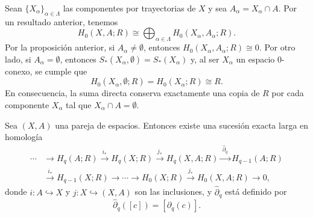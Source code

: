 \begin{dem}
Sean $\{X_\alpha\}_{\alpha \in \Lambda}$ las componentes por trayectorias de $X$ y sea $A_\alpha = X_\alpha \cap A$. Por un resultado anterior, tenemos
\[
H_0(X, A; R) \cong \bigoplus_{\alpha \in \Lambda} H_0(X_\alpha, A_\alpha; R).
\]
Por la proposición anterior, si $A_\alpha \neq \emptyset$, entonces $H_0(X_\alpha, A_\alpha; R) \cong 0$. Por otro lado, si $A_\alpha = \emptyset$, entonces $S_*(X_\alpha, \emptyset) = S_*(X_\alpha)$ y, al ser $X_\alpha$ un espacio $0$-conexo, se cumple que 
$$H_0(X_\alpha, \emptyset; R) = H_0(X_\alpha; R) \cong R.$$ 
En consecuencia, la suma directa conserva exactamente una copia de $R$ por cada componente $X_\alpha$ tal que $X_\alpha \cap A = \emptyset$.
\end{dem}
\begin{teorema}
Sea $(X, A)$ una pareja de espacios. Entonces existe una sucesión exacta larga en homología
\begin{align*}
\cdots &\longrightarrow H_q(A; R) \xrightarrow{\;i_*\;} H_q(X; R) \xrightarrow{\;j_*\;} H_q(X, A; R) \xrightarrow{\;\hat{\partial}_q\;} H_{q-1}(A; R) \\
&\xrightarrow{\;i_*\;} H_{q-1}(X; R) \longrightarrow \cdots \longrightarrow H_0(X; R) \xrightarrow{\;j_*\;} H_0(X, A; R) \longrightarrow 0,
\end{align*}
donde $i \colon A \hookrightarrow X$ y $j \colon X \hookrightarrow (X, A)$ son las inclusiones, y $\hat{\partial}_q$ está definido por
\[
\hat{\partial}_q([c]) = [\partial_q(c)].
\]
\end{teorema}

